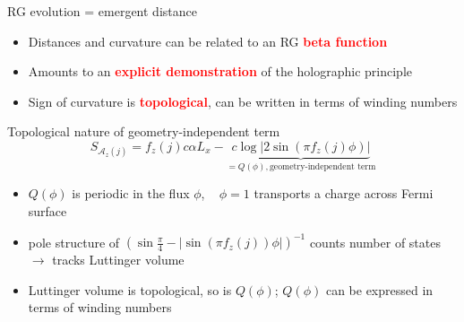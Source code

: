 \documentclass[11pt,aspectratio=169]{beamer}
\newcommand{\focus}[1]{\textcolor{red}{\bf{#1}}}
\begin{document}
\begin{frame}{RG evolution = emergent distance}
\begin{itemize}
	\item Distances and curvature can be related to an RG \focus{beta function}\\[10pt]
	\item Amounts to an \focus{explicit demonstration} of the holographic principle\\[10pt]
	\item Sign of curvature is \focus{topological}, can be written in terms of winding numbers\\[10pt]
\end{itemize}
	
\end{frame}

\begin{frame}{Topological nature of geometry-independent term}
	\[S_{\mathcal{A}_z(j)} = f_z(j) c \alpha L_x - \underbrace{c \log \big|2\sin\left(\pi f_z(j)\phi\right)\big|}_{=Q(\phi),\text{geometry-independent term}}\]
	\begin{itemize}
	\item \(Q(\phi)\) is periodic in the flux \(\phi\), ~ \(\phi=1\) transports a charge across Fermi surface\\[10pt]
	\item pole structure of \(\left(\sin \frac{\pi}{4} - |\sin\left(\pi f_z(j)\right)\phi|\right)^{-1}\) counts number of states \(\longrightarrow\) tracks Luttinger volume\\[10pt]
	\item Luttinger volume is topological, so is \(Q(\phi)\); \(Q(\phi)\) can be expressed in terms of winding numbers
	\end{itemize}
	
\end{frame}
\end{document}

